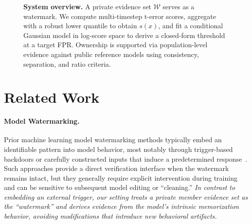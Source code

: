 \documentclass[sigconf, review, anonymous]{acmart}
\begin{document}
\begin{figure}[t]
\caption{\textbf{System overview.}
A private evidence set $\mathcal{W}$ serves as a watermark. We compute multi-timestep t-error scores, aggregate with a robust lower quantile to obtain $s(x)$, and fit a conditional Gaussian model in log-score space to derive a closed-form threshold at a target FPR. Ownership is supported via population-level evidence against public reference models using consistency, separation, and ratio criteria.}
\label{fig:overview}
\end{figure}

\section{Related Work}
\label{sec:related}

\paragraph{Model Watermarking.}
Prior machine learning model watermarking methods typically embed an identifiable pattern into model behavior, most notably through trigger-based backdoors or carefully constructed inputs that induce a predetermined response~\citep{adi2018turning,zhang2018protecting,fernandez2023stable,wen2023tree}.
Such approaches provide a direct verification interface when the watermark remains intact, but they generally require explicit intervention during training and can be sensitive to subsequent model editing or ``cleaning.''
\textit{In contrast to embedding an external trigger, our setting treats a private member evidence set as the ``watermark'' and derives evidence from the model's intrinsic memorization behavior, avoiding modifications that introduce new behavioral artifacts.}
\end{document}
